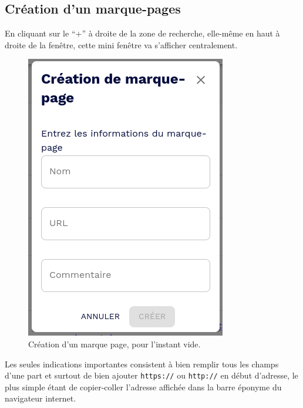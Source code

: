 \subsection{Création d'un marque-pages}
En cliquant sur le ``+'' à droite de la zone de recherche, elle-même en haut à droite de la fenêtre, cette mini fenêtre va s'afficher centralement.
\begin{figure}
	\centering
	\includegraphics[width=0.333\linewidth]{./Captures/portail.marque.pages.creation.png}
	\caption{Création d'un marque page, pour l'instant vide.}
\end{figure}
Les seules indications importantes consistent à bien remplir tous les champs d'une part et surtout de bien ajouter \texttt{https://} ou \texttt{http://} en début d'adresse, le plus simple étant de copier-coller l'adresse affichée dans la barre éponyme du navigateur internet.
